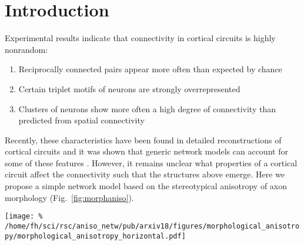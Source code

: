 \section{Introduction}
\vspace{-0.5cm}

Experimental results indicate that connectivity in cortical circuits is highly nonrandom:
\begin{enumerate}[leftmargin=2cm]
  \itemsep0pt
\item Reciprocally connected pairs appear more often than expected by chance \cite{Song2005, Perin2011}
\item Certain triplet motifs of neurons are strongly overrepresented \cite{Song2005}
  \item Clusters of neurons show more often a high degree of connectivity than predicted from spatial connectivity \cite{Perin2011}
  \end{enumerate}

Recently, these characteristics have been found in detailed reconstructions of cortical circuits \cite{Gal2017} and it was shown that generic network models can account for some of these features \cite{vegue2017}. However, it remains unclear what properties of a cortical circuit affect the connectivity such that the structures above emerge. Here we propose a simple network model based on the stereotypical anisotropy of axon morphology (Fig.~\ref{fig:morphaniso}).

\begin{center}\vspace{0.7cm}
  \texttt{[image: \%
    /home/fh/sci/rsc/aniso\_netw/pub/arxiv18/figures/morphological\_anisotropy/morphological\_anisotropy\_horizontal.pdf]}
  \label{fig:morphaniso}
\end{center}\vspace{2cm}

